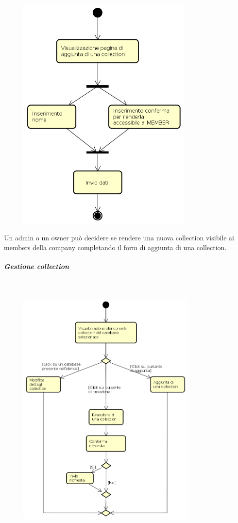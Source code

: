 \begin{figure}[H]
\begin{center}
\includegraphics[height=12cm]{res/sections/backend/activities/aggiuntaDatiCollection.png}
\end{center}
\end{figure}
Un admin o un owner può decidere se rendere una nuova collection visibile ai members della company completando il form di aggiunta di una collection.
\subparagraph{Gestione collection} \mbox{} \\
\begin{figure}[H]
\begin{center}
\includegraphics[height=12cm]{res/sections/backend/activities/gestioneCollectionAdmin.png}
\end{center}
\end{figure}
